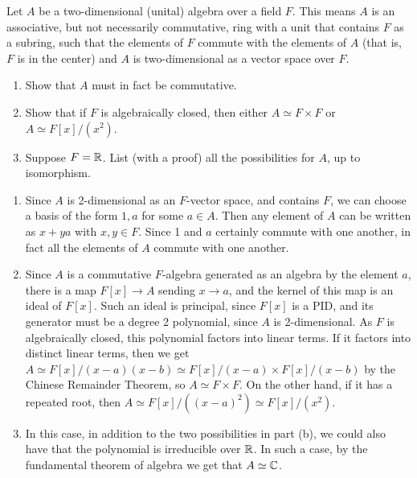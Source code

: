 \begin{question}[subtitle = August 2018 Problem 5,ID=Aug18_5]
Let $A$ be a two-dimensional (unital) algebra over a field $F$. This means $A$ is an associative, but not necessarily commutative, ring with a unit that contains $F$ as a subring, such that the elements of $F$ commute with the elements of $A$ (that is, $F$ is in the center) and $A$ is two-dimensional as a vector space over $F$.
\begin{enumerate}
    \item Show that $A$ must in fact be commutative.
    \item Show that if $F$ is algebraically closed, then either $A \simeq F \times F$ or $A \simeq F[x]/(x^2)$.
    \item Suppose $F = \mathbb{R}$. List (with a proof) all the possibilities for $A$, up to isomorphism.
\end{enumerate}
\end{question}
\begin{solution}
\begin{enumerate}
    \item Since $A$ is 2-dimensional as an $F$-vector space, and contains $F$, we can choose a basis of the form $1,a$ for some $a \in A$. Then any element of $A$ can be written as $x+ya$ with $x,y \in F$. Since 1 and $a$ certainly commute with one another, in fact all the elements of $A$ commute with one another.
    \item Since $A$ is a commutative $F$-algebra generated as an algebra by the element $a$, there is a map $F[x] \to A$ sending $x \to a$, and the kernel of this map is an ideal of $F[x]$. Such an ideal is principal, since $F[x]$ is a PID, and its generator must be a degree 2 polynomial, since $A$ is 2-dimensional. As $F$ is algebraically closed, this polynomial factors into linear terms. If it factors into distinct linear terms, then we get $A \simeq F[x]/(x-a)(x-b) \simeq F[x]/(x-a) \times F[x]/(x-b)$ by the Chinese Remainder Theorem, so $A \simeq F \times F$. On the other hand, if it has a repeated root, then $A \simeq F[x]/((x-a)^2) \simeq F[x]/(x^2)$.
    \item In this case, in addition to the two possibilities in part (b), we could also have that the polynomial is irreducible over $\mathbb{R}$. In such a case, by the fundamental theorem of algebra we get that $A \simeq \mathbb{C}$.
\end{enumerate}
\end{solution}

